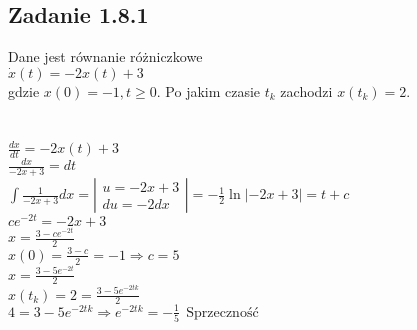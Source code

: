 \pagebreak
\subsection*{Zadanie 1.8.1} {\color{darkgray}
	Dane jest równanie różniczkowe\\
	$\dot{x}(t)=-2x(t)+3$\\
	gdzie $x(0)=-1, t\geqslant 0$. Po jakim czasie $t_k$ zachodzi $x(t_k)=2$.\\
}\lineh
\\\\
$\frac{dx}{dt}=-2x(t)+3$\\
$\frac{dx}{-2x+3}=dt$\\
$\int \frac{1}{-2x+3} dx = \left|\begin{array}{c}u=-2x+3 \\du=-2dx\end{array}\right|=-\frac 12 \ln |-2x+3|=t+c$\\
$ce^{-2t}=-2x+3$\\
$x=\frac{3-ce^{-2t}}{2}$\\
$x(0)=\frac{3-c}{2}=-1 \Rightarrow c=5$\\
$x=\frac{3-5e^{-2t}}{2}$\\
$x(t_k)=2=\frac{3-5e^{-2tk}}{2}$\\
$4=3-5e^{-2tk} \Rightarrow e^{-2tk}=-\frac 15 \ \ \boxed{\text{Sprzeczność}}$\\





\pagebreak
